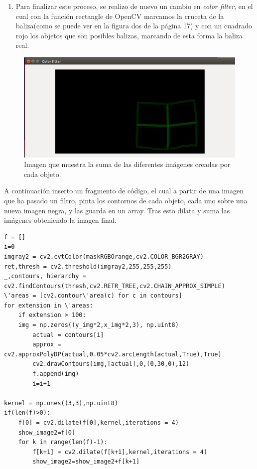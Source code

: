 \begin{enumerate}
	\item Para finalizar este proceso, se realizo de nuevo un cambio en \textit{color filter}, en el cual con la funci\'on rectangle de OpenCV marcamos la cruceta de la baliza(como se puede ver en la figura dos de la p\'agina 17) y con un cuadrado rojo los objetos que son posibles balizas, marcando de esta forma la baliza real.
\end{enumerate}
\vspace{2mm}
\begin{figure}[ht]
	\centering
		\includegraphics[width=1.1\textwidth]{imgs/k_Beacon1.eps}
		\caption{Imagen que muestra la suma de las diferentes im\'agenes creadas por cada objeto.}
	\label{fig:k_Beacon1}
\end{figure}
\vspace{3mm}

\hspace{1cm} A continuaci\'on inserto un fragmento de c\'odigo, el cual a partir de una imagen que ha pasado un filtro, pinta los contornos de cada objeto, cada uno sobre una nueva imagen negra, y las guarda en un array. Tras esto dilata y suma las im\'agenes obteniendo la imagen final.

\begin{verbatim}
f = []
i=0
imgray2 = cv2.cvtColor(maskRGBOrange,cv2.COLOR_BGR2GRAY)
ret,thresh = cv2.threshold(imgray2,255,255,255)
_,contours, hierarchy = cv2.findContours(thresh,cv2.RETR_TREE,cv2.CHAIN_APPROX_SIMPLE)
\'areas = [cv2.contour\'area(c) for c in contours]
for extension in \'areas:
    if extension > 100:
    img = np.zeros((y_img*2,x_img*2,3), np.uint8)
        actual = contours[i]
        approx = cv2.approxPolyDP(actual,0.05*cv2.arcLength(actual,True),True)
        cv2.drawContours(img,[actual],0,(0,30,0),12)
        f.append(img)
        i=i+1
			
kernel = np.ones((3,3),np.uint8)
if(len(f)>0):
    f[0] = cv2.dilate(f[0],kernel,iterations = 4)
    show_image2=f[0]
    for k in range(len(f)-1):
        f[k+1] = cv2.dilate(f[k+1],kernel,iterations = 4)
        show_image2=show_image2+f[k+1]
		
\end{verbatim}

